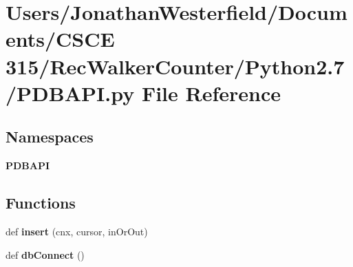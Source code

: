 \section{Users/\+Jonathan\+Westerfield/\+Documents/\+C\+S\+CE 315/\+Rec\+Walker\+Counter/\+Python2.7/\+P\+D\+B\+A\+PI.py File Reference}
\label{_87_2_p_d_b_a_p_i_8py}
\subsection*{Namespaces}
\begin{DoxyCompactItemize}
\item 
 {\bf P\+D\+B\+A\+PI}
\end{DoxyCompactItemize}
\subsection*{Functions}
\begin{DoxyCompactItemize}
\item 
def {\bf insert} (cnx, cursor, in\+Or\+Out)
\item 
def {\bf db\+Connect} ()
\end{DoxyCompactItemize}
